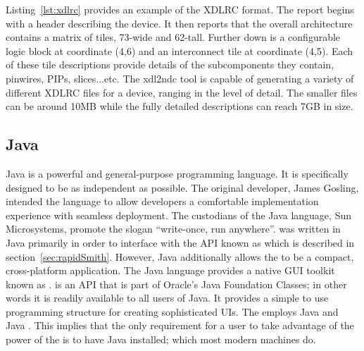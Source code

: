 Listing~\ref{lst:xdlrc} provides an example of the XDLRC format.
The report begins with a header describing the device.
It then reports that the overall architecture contains a matrix of tiles, 73-wide and 62-tall.
Further down is a configurable logic block at coordinate (4,6) and an interconnect tile at coordinate (4,5).
Each of these tile descriptions provide details of the subcomponents they contain, pinwires, \acrshort{PIP}s, slices...etc.
The \gls{xdl2ndc} tool is capable of generating a variety of different XDLRC files for a device, ranging in the level of detail.
The smaller files can be around 10MB while the fully detailed descriptions can reach 7GB in size.
\subsection{Java} \label{sec:java}
Java is a powerful and general-purpose programming language. 
It is specifically designed to be as independent as possible.
The original developer, James Gosling, intended the language to allow developers a comfortable implementation experience with seamless deployment. 
The custodians of the Java language, Sun Microsystems, promote the slogan ``write-once, run anywhere''.  
\NameNoPeriod was written in Java primarily in order to interface with the \acrshort{API} known as \RapidSmith which is described in section~\ref{sec:rapidSmith}.
However, Java additionally allows the \NameNoPeriod to be a compact, cross-platform application.
The Java language provides a native \acrfull{GUI} toolkit known as \SwingEnd.
\Swing is an \acrshort{API} that is part of Oracle's Java Foundation Classes; in other words it is readily available to all users of Java.
It provides a simple to use programming structure for creating sophisticated \acrshort{UIs}.
The \NameNoPeriod employs Java and Java \Swing.
This implies that the only requirement for a user to take advantage of the power of the \NameNoPeriod is to have Java installed; which most modern machines do.

